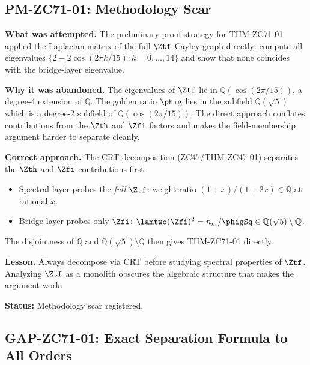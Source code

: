 \documentclass[12pt, a4paper]{article}
\begin{document}
\subsection{PM-ZC71-01: Methodology Scar}
\label{sec:pm}

\begin{derivedbox}[title={PM-ZC71-01: Abandoned Direct $\Ztf$ Laplacian
  Approach (Failure Stance)}]

\textbf{What was attempted.}
The preliminary proof strategy for THM-ZC71-01 applied the
Laplacian matrix of the full $\Ztf$ Cayley graph directly:
compute all eigenvalues $\{2 - 2\cos(2\pi k/15) : k=0,\ldots,14\}$
and show that none coincides with the bridge-layer eigenvalue.

\textbf{Why it was abandoned.}
The eigenvalues of $\Ztf$ lie in $\mathbb{Q}(\cos(2\pi/15))$,
a degree-4 extension of $\mathbb{Q}$.
The golden ratio $\phig$ lies in the subfield $\mathbb{Q}(\sqrt{5})$
which is a degree-2 subfield of $\mathbb{Q}(\cos(2\pi/15))$.
The direct approach conflates contributions from the $\Zth$ and
$\Zfi$ factors and makes the field-membership argument harder
to separate cleanly.

\textbf{Correct approach.}
The CRT decomposition (ZC47/THM-ZC47-01) separates the
$\Zth$ and $\Zfi$ contributions first:
\begin{itemize}[leftmargin=2em, noitemsep]
  \item Spectral layer probes the \emph{full} $\Ztf$: weight ratio
    $(1+x)/(1+2x) \in \mathbb{Q}$ at rational $x$.
  \item Bridge layer probes only $\Zfi$: $\lamtwo(\Zfi)^2 = n_m/\phigSq
    \in \mathbb{Q}(\sqrt{5})\setminus\mathbb{Q}$.
\end{itemize}
The disjointness of $\mathbb{Q}$ and $\mathbb{Q}(\sqrt{5})\setminus\mathbb{Q}$
then gives THM-ZC71-01 directly.

\textbf{Lesson.} Always decompose via CRT before studying spectral
properties of $\Ztf$. Analyzing $\Ztf$ as a monolith obscures the
algebraic structure that makes the argument work.

\textbf{Status:} Methodology scar registered.
\end{derivedbox}

\subsection{GAP-ZC71-01: Exact Separation Formula to All Orders}
\label{sec:gap01}
\end{document}
